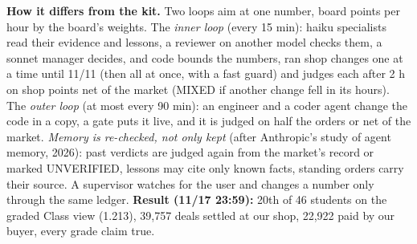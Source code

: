 \documentclass[11pt]{article}
\begin{document}
\vspace{1mm}
\begin{minipage}{0.98\linewidth}\scriptsize
\textbf{How it differs from the kit.} Two loops aim at one number, board points per hour by the board's weights. The \emph{inner loop} (every 15 min): haiku specialists read their evidence and lessons, a reviewer on another model checks them, a sonnet manager decides, and code bounds the numbers, ran shop changes one at a time until 11/11 (then all at once, with a fast guard) and judges each after 2 h on shop points net of the market (MIXED if another change fell in its hours). The \emph{outer loop} (at most every 90 min): an engineer and a coder agent change the code in a copy, a gate puts it live, and it is judged on half the orders or net of the market. \emph{Memory is re-checked, not only kept} (after Anthropic's study of agent memory, 2026): past verdicts are judged again from the market's record or marked UNVERIFIED, lessons may cite only known facts, standing orders carry their source. A supervisor watches for the user and changes a number only through the same ledger. \textbf{Result (11/17 23:59):} 20th of 46 students on the graded Class view (1.213), 39,757 deals settled at our shop, 22,922 paid by our buyer, every grade claim true.
\end{minipage}
\end{document}
